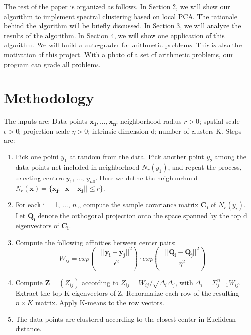 \documentclass[11pt, oneside]{article}   	%
\begin{document}
The rest of the paper is organized as follows. In Section 2, we will show our algorithm to implement spectral clustering based on local PCA.  The rationale behind the algorithm will be briefly discussed. In Section 3, we will analyze the results of the algorithm. In Section 4, we will show one application of this algorithm. We will build a auto-grader for arithmetic problems. This is also the motivation of this project. With a photo of a set of arithmetic problems, our program can grade all problems.  

\section{Methodology}
The inputs are: Data points $\boldsymbol{x_1}, ..., \boldsymbol{x_n}$; neighborhood radius $r>0$; spatial scale $\epsilon>0$; projection scale $\eta>0$; intrinsic dimension d; number of clusters K. Steps are:
\begin{enumerate}
\item Pick one point $y_1$ at random from the data. Pick another point $y_2$ among the data points not included in neighborhood $N_r(y_1)$, and repeat the process, selecting centers $y_1$, ..., $y_{n0}$. Here we define the neighborhood $N_r(\boldsymbol{x})=\{\boldsymbol{x_j} : ||\boldsymbol{x}-\boldsymbol{x_j}|| \leqslant r\}$.
\item For each i = 1, ..., $n_0$, compute the sample covariance matrix $\boldsymbol{C_i}$ of $N_r(y_i)$. Let $\boldsymbol{Q_i}$ denote the orthogonal projection onto the space spanned by the top d eigenvectors of $\boldsymbol{C_i}$.
\item Compute the following affinities between center pairs:
\begin{equation}
W_{ij}=exp(-\frac{||\boldsymbol{y_i}-\boldsymbol{y_j}||^2}{\epsilon^2}) \cdot exp(-\frac{||\boldsymbol{Q_i}-\boldsymbol{Q_j}||^2}{\eta^2})
\end{equation}
\item Compute $\boldsymbol{Z} = (Z_{ij})$ according to $Z_{ij} = W_{ij}/\sqrt{\Delta_i \Delta_j}$, with $\Delta_i=\Sigma_{j=1}^{n} W_{ij}$. Extract the top K eigenvectors of Z. Renormalize each row of the resulting $n \times K$ matrix. Apply K-means to the row vectors.
\item The data points are clustered according to the closest center in Euclidean distance.
\end{enumerate}



\end{document}
